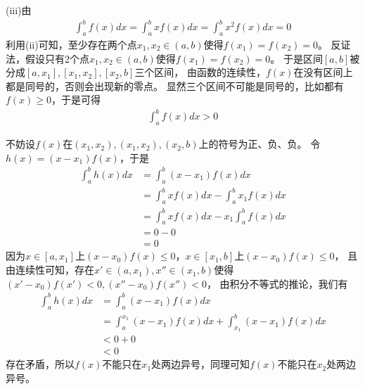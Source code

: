 \documentclass{article}
\begin{document}
(iii)由
\begin{align*}
  \int_{a}^{b} f(x) dx = \int_{a}^{b} xf(x) dx = \int_{a}^{b} x^2 f(x) dx = 0
\end{align*}
利用(ii)可知，至少存在两个点$x_1, x_2 \in (a, b)$使得$f(x_1) = f(x_2) = 0$。
反证法，假设只有2个点$x_1, x_2 \in (a, b)$使得$f(x_1) = f(x_2) = 0$。
于是区间$[a,b]$被分成$[a, x_1], [x_1, x_2], [x_2, b]$三个区间，
由函数的连续性，$f(x)$在没有区间上都是同号的，否则会出现新的零点。
显然三个区间不可能是同号的，比如都有$f(x) \geq 0$，于是可得
\begin{align*}
  \int_{a}^{b} f(x) dx > 0
\end{align*}

不妨设$f(x)$在$(x_1, x_2), (x_1, x_2), (x_2, b)$上的符号为正、负、负。
令$h(x) = (x - x_1)f(x)$，于是
\begin{align*}
  \int_{a}^{b} h(x) dx & = \int_{a}^{b} (x - x_1)f(x) dx                    \\
                       & = \int_{a}^{b} xf(x) dx - \int_{a}^{b} x_1f(x) dx  \\
                       & = \int_{a}^{b} xf(x) dx - x_1 \int_{a}^{b} f(x) dx \\
                       & = 0 - 0                                            \\
                       & = 0
\end{align*}
因为$x \in [a, x_1]$上$(x - x_0) f(x) \leq 0$，$x \in [x_1, b]$上$(x - x_0) f(x) \leq 0$，
且由连续性可知，存在$x' \in (a, x_1), x'' \in (x_1, b)$使得$(x' - x_0) f(x') < 0, (x'' - x_0) f(x'') < 0$，
由积分不等式的推论，我们有
\begin{align*}
  \int_{a}^{b} h(x) dx & = \int_{a}^{b} (x - x_1)f(x) dx                                     \\
                       & = \int_{a}^{x_1} (x - x_1)f(x) dx + \int_{x_1}^{b} (x - x_1)f(x) dx \\
                       & < 0 + 0                                                             \\
                       & < 0
\end{align*}
存在矛盾，所以$f(x)$不能只在$x_1$处两边异号，同理可知$f(x)$不能只在$x_2$处两边异号。
\end{document}

